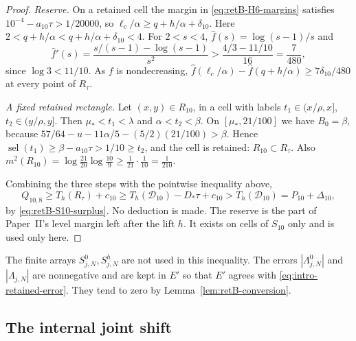 \begin{proof}
\emph{Reserve.} On a retained cell the margin in
\eqref{eq:retB-H6-margins} satisfies $10^{-4}-a_{10}\tau>1/20000$, so
$\ell_c/\alpha\ge q+h/\alpha+\delta_{10}$. Here
$2<q+h/\alpha<q+h/\alpha+\delta_{10}<4$. For \(2<s<4\),
$\widehat f(s)=\log(s-1)/s$ and
\[
 \widehat f'(s)=\frac{s/(s-1)-\log(s-1)}{s^2}
 >\frac{4/3-11/10}{16}=\frac7{480},
\]
since $\log3<11/10$. As $f$ is nondecreasing,
$\widehat f(\ell_c/\alpha)-\widehat f(q+h/\alpha)\ge7\delta_{10}/480$ at
every point of $R_\tau$.

\emph{A fixed retained rectangle.} Let $(x,y)\in R_{10}$, in a cell with
labels $t_1\in(x/\rho,x]$, $t_2\in(y/\rho,y]$. Then $\mu_*<t_1<\lambda$ and
$\alpha<t_2<\beta$. On $[\mu_*,21/100]$ we have $B_0=\beta$, because
$57/64-u-11\alpha/5-(5/2)(21/100)>\beta$. Hence
$\operatorname{sel}(t_1)\ge\beta-a_{10}\tau>1/10\ge t_2$, and the cell is
retained: $R_{10}\subset R_\tau$. Also
$m^2(R_{10})=\log\frac{21}{20}\log\frac{10}9\ge\frac1{21}\cdot\frac1{10}
=\frac1{210}$.

Combining the three steps with the pointwise inequality above,
\[
 Q_{10,8}\ge T_h(R_\tau)+c_{10}
 \ge T_h(\mathcal D_{10})-D_*\tau+c_{10}>T_h(\mathcal D_{10})
 =P_{10}+\Delta_{10},
\]
by \eqref{eq:retB-S10-surplus}. No deduction is made. The reserve is the
part of Paper~II's level margin left after the lift $h$. It exists on cells
of $S_{10}$ only and is used only here.
\end{proof}

The finite arrays $S^0_{j,N},S^h_{j,N}$ are not used in this inequality.
The errors $|\Lambda^0_{j,N}|$ and $|\Lambda_{j,N}|$ are nonnegative and are
kept in $E'$ so that $E'$ agrees with \eqref{eq:intro-retained-error}.
They tend to zero by Lemma~\ref{lem:retB-conversion}.

\subsection{The internal joint shift}

